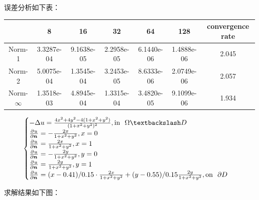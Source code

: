 \documentclass[lang=cn,a4paper,newtx,bibend=bibtex]{elegantpaper}
\begin{document}
误差分析如下表：

\begin{table}[H]
  \centering
  \begin{tabular}{|c|c|c|c|c|c|c|}
  \hline
   & 8 & 16 & 32 & 64 & 128 & convergence rate \\
  \hline
  Norm-1 & 3.3287e-04 & 9.1638e-05 & 2.2958e-05 & 6.1440e-06 & 1.4888e-06 & 2.045 \\
  Norm-2 & 5.0075e-04 & 1.3545e-04 & 3.2453e-05 & 8.6333e-06 & 2.0749e-06 & 2.057 \\
  Norm-$\infty$ & 1.3518e-03 & 4.8945e-04 & 1.3315e-04 & 3.4820e-05 & 9.1099e-06 & 1.934 \\
  \hline
  \end{tabular}
  \end{table}


\[
\begin{cases}
  - \Delta u = \frac{4x^2 + 4y^2 - 4(1 + x^2 + y^2)}{(1 + x^2 + y^2)^2}, \text{in~~} \Omega \fxg D \\
  \apart{u}{\bm{n}}{} = -\frac{2x}{1+x^2+y^2}, x = 0 \\
  \apart{u}{\bm{n}}{} = \frac{2x}{1+x^2+y^2}, x = 1 \\  
  \apart{u}{\bm{n}}{} = -\frac{2y}{1+x^2+y^2}, y = 0 \\
  \apart{u}{\bm{n}}{} = \frac{2y}{1+x^2+y^2}, y = 1 \\ 
  \apart{u}{\bm{n}}{} = (x - 0.41)/0.15\cdot\frac{2x}{1+x^2+y^2} + ( y - 0.55) / 0.15 \frac{2y}{1+x^2+y^2}, \text{on~~} \partial D
\end{cases}
\]

求解结果如下图：
\end{document}
